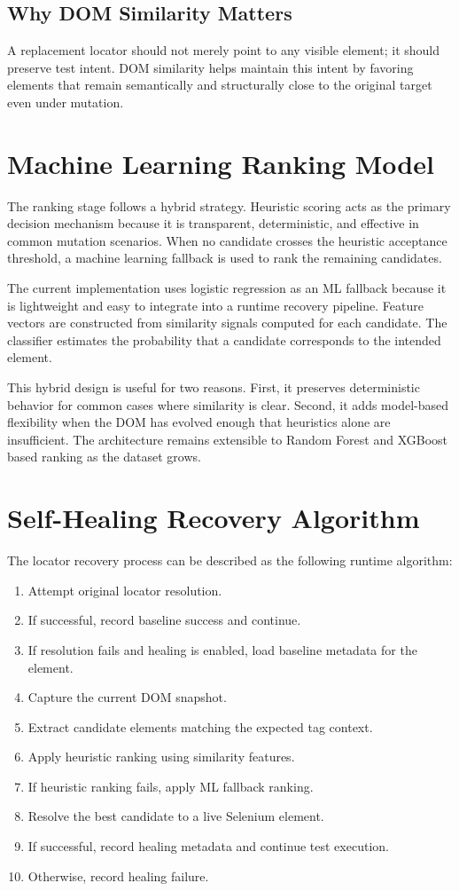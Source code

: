 \documentclass[conference]{IEEEtran}
\begin{document}
\subsection{Why DOM Similarity Matters}
A replacement locator should not merely point to any visible element; it should preserve test intent. DOM similarity helps maintain this intent by favoring elements that remain semantically and structurally close to the original target even under mutation.

\section{Machine Learning Ranking Model}
The ranking stage follows a hybrid strategy. Heuristic scoring acts as the primary decision mechanism because it is transparent, deterministic, and effective in common mutation scenarios. When no candidate crosses the heuristic acceptance threshold, a machine learning fallback is used to rank the remaining candidates.

The current implementation uses logistic regression as an ML fallback because it is lightweight and easy to integrate into a runtime recovery pipeline. Feature vectors are constructed from similarity signals computed for each candidate. The classifier estimates the probability that a candidate corresponds to the intended element.

This hybrid design is useful for two reasons. First, it preserves deterministic behavior for common cases where similarity is clear. Second, it adds model-based flexibility when the DOM has evolved enough that heuristics alone are insufficient. The architecture remains extensible to Random Forest and XGBoost based ranking as the dataset grows.

\section{Self-Healing Recovery Algorithm}
The locator recovery process can be described as the following runtime algorithm:
\begin{enumerate}[leftmargin=1.2em]
    \item Attempt original locator resolution.
    \item If successful, record baseline success and continue.
    \item If resolution fails and healing is enabled, load baseline metadata for the element.
    \item Capture the current DOM snapshot.
    \item Extract candidate elements matching the expected tag context.
    \item Apply heuristic ranking using similarity features.
    \item If heuristic ranking fails, apply ML fallback ranking.
    \item Resolve the best candidate to a live Selenium element.
    \item If successful, record healing metadata and continue test execution.
    \item Otherwise, record healing failure.
\end{enumerate}
\end{document}
